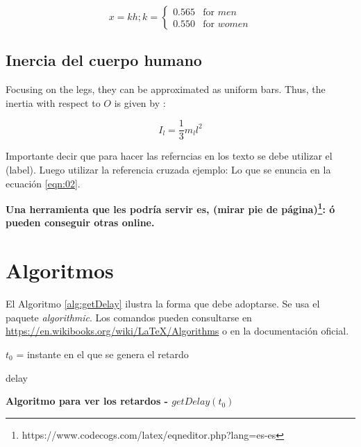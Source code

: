 \begin{equation}
\label{eqn:01}
x=kh; k = 
\begin{cases} 
0.565  & \mbox{for } men   \\
0.550  & \mbox{for } women
\end{cases}
\end{equation}

\subsection{Inercia del cuerpo humano}

Focusing on the legs, they can be approximated as uniform bars. Thus, the inertia with respect to $O$ is given by \cite{ref:young2006sears}:

\begin{equation}
\label{eqn:02}
I_l = \frac{1}{3}m_ll^2
\end{equation}

Importante decir que para hacer las referncias en los texto se debe utilizar el (label). Luego utilizar la referencia cruzada ejemplo: Lo que se enuncia en la ecuación \ref{eqn:02}.

\textbf{Una herramienta que les podría servir es, (mirar pie de página)\footnote{https://www.codecogs.com/latex/eqneditor.php?lang=es-es}:  \'o pueden conseguir otras online. }

\section{Algoritmos}
El Algoritmo \ref{alg:getDelay} ilustra la forma que debe adoptarse. Se usa el paquete \textit{algorithmic}. Los comandos pueden consultarse en \url{https://en.wikibooks.org/wiki/LaTeX/Algorithms} o en la documentación oficial.

\begin{algorithm}[htbp]
	\begin{algorithmic}
	\REQUIRE $t_0$ = instante en el que se genera el retardo
	
		\ELSE
			\ELSE
			\ENDIF
		\ENDIF
	\ELSE
	\ENDIF
	
	\RETURN delay
	\end{algorithmic}
	\caption{\textbf{Algoritmo para ver los retardos - $getDelay(t_0)$}}
	\label{alg:getDelay}
\end{algorithm}
